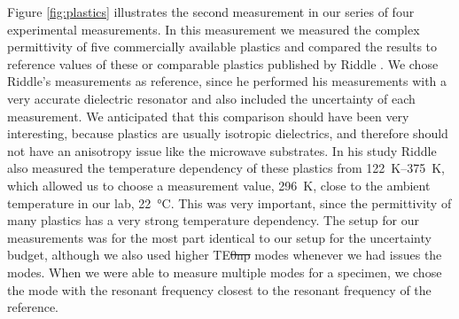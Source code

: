 Figure \ref{fig:plastics} illustrates the second measurement in our series of four experimental measurements. In this measurement we measured the complex permittivity of five commercially available plastics and compared the results to reference values of these or comparable plastics published by Riddle \cite{riddle}. We chose Riddle's measurements as reference, since he performed his measurements with a very accurate dielectric resonator and also included the uncertainty of each measurement. We anticipated that this comparison should have been very interesting, because plastics are usually isotropic dielectrics, and therefore should not have an anisotropy issue like the microwave substrates. In his study Riddle also measured the temperature dependency of these plastics from \SIrange{122}{375}{\kelvin}, which allowed us to choose a measurement value, \SI{296}{\kelvin}, close to the ambient temperature in our lab, \SI{22}{\celsius}. This was very important, since the permittivity of many plastics has a very strong temperature dependency. The setup for our measurements was for the most part identical to our setup for the uncertainty budget, although we also used higher TE\st{0np} modes whenever we had issues the \te{} modes. When we were able to measure multiple modes for a specimen, we chose the mode with the resonant frequency closest to the resonant frequency of the reference.

